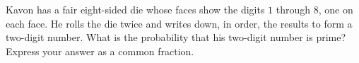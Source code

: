 Kavon has a fair eight-sided die whose faces show the digits $1$ through $8$, one on each face. He rolls the die twice and writes down, in order, the results to form a two-digit number. What is the probability that his two-digit number is prime? Express your answer as a common fraction.

